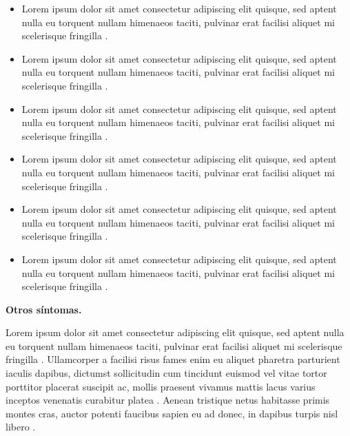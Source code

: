 \documentclass{article}
\begin{document}
    \begin{itemize}
        \item Lorem ipsum dolor sit amet consectetur adipiscing elit quisque, sed aptent nulla eu torquent nullam himenaeos taciti, pulvinar erat facilisi aliquet mi scelerisque fringilla \cite{C}. 
        \item Lorem ipsum dolor sit amet consectetur adipiscing elit quisque, sed aptent nulla eu torquent nullam himenaeos taciti, pulvinar erat facilisi aliquet mi scelerisque fringilla \cite{C}.
        \item Lorem ipsum dolor sit amet consectetur adipiscing elit quisque, sed aptent nulla eu torquent nullam himenaeos taciti, pulvinar erat facilisi aliquet mi scelerisque fringilla \cite{C}.
        \item Lorem ipsum dolor sit amet consectetur adipiscing elit quisque, sed aptent nulla eu torquent nullam himenaeos taciti, pulvinar erat facilisi aliquet mi scelerisque fringilla \cite{C}.
        \item Lorem ipsum dolor sit amet consectetur adipiscing elit quisque, sed aptent nulla eu torquent nullam himenaeos taciti, pulvinar erat facilisi aliquet mi scelerisque fringilla \cite{C}.
        \item Lorem ipsum dolor sit amet consectetur adipiscing elit quisque, sed aptent nulla eu torquent nullam himenaeos taciti, pulvinar erat facilisi aliquet mi scelerisque fringilla \cite{C}.
    \end{itemize}

\textbf{Otros síntomas.}

Lorem ipsum dolor sit amet consectetur adipiscing elit quisque, sed aptent nulla eu torquent nullam himenaeos taciti, pulvinar erat facilisi aliquet mi scelerisque fringilla \cite{C}. Ullamcorper a facilisi risus fames enim eu aliquet pharetra parturient iaculis dapibus, dictumst sollicitudin cum tincidunt euismod vel vitae tortor porttitor placerat suscipit ac, mollis praesent vivamus mattis lacus varius inceptos venenatis curabitur platea \cite{A}. Aenean tristique netus habitasse primis montes cras, auctor potenti faucibus sapien eu ad donec, in dapibus turpis nisl libero \cite{B}.
\end{document}
